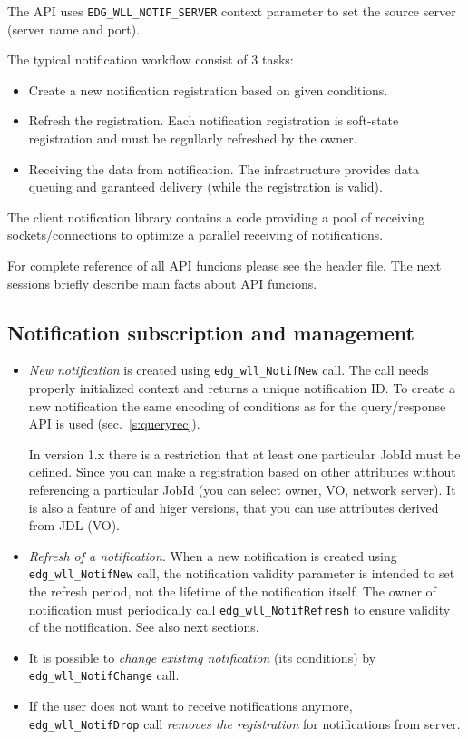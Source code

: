 The API uses \verb'EDG_WLL_NOTIF_SERVER' context parameter to set the
source server (\LB server name and port). 

The typical notification workflow consist of 3 tasks:
\begin{itemize}
 \item Create a new notification registration based on given conditions.
 \item Refresh the registration. Each notification registration is
  soft-state registration and must be regullarly refreshed by the
  owner.
 \item Receiving the data from notification. The \LB infrastructure
  provides data queuing and garanteed delivery (while the registration
  is valid). 
\end{itemize}

The client notification library contains a code providing a pool of
receiving sockets/connections to optimize a parallel receiving of
notifications.

For complete reference of all API funcions please see the header
file. The next sessions briefly describe main facts about API
funcions.

\subsection{Notification subscription and management}
\begin{itemize}
 \item \emph{New notification} is created using
  \verb'edg_wll_NotifNew' call. The call needs properly initialized
  context and returns a unique notification ID. To create a new
  notification the same encoding of conditions as for the \LB
  query/response API is used (sec.~\ref{s:queryrec}). 

  In version 1.x there is a restriction that at least one particular
  JobId must be defined. Since  you can make a registration based
  on other attributes without referencing a particular JobId (you can
  select owner, VO, network server).  It is also a feature of 
  and higer versions, that you can use attributes derived from JDL (VO).

 \item \emph {Refresh of a notification}. When a new notification is
  created using \verb'edg_wll_NotifNew' call, the notification
  validity parameter is intended to set the refresh period, not the
  lifetime of the notification itself. The owner of notification must
  periodically call \verb'edg_wll_NotifRefresh' to ensure validity of
  the notification. See also next sections.

 \item It is possible to \emph{change existing notification} (its conditions) by
  \verb'edg_wll_NotifChange' call.

 \item If the user does not want to receive notifications anymore,
  \verb'edg_wll_NotifDrop' call \emph{removes the registration} for
  notifications from \LB server.
\end{itemize}

